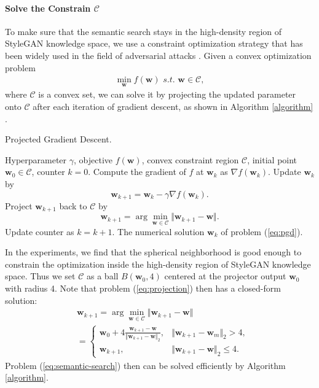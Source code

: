 \documentclass[10pt,twocolumn,letterpaper]{article}
\newcommand{\w}{\bm{w}}
\begin{document}
\paragraph{Solve the Constrain $\mathcal{C}$}To make sure that the semantic search stays in the high-density region of StyleGAN knowledge space, we use a constraint optimization strategy that has been widely used in the field of adversarial attacks \cite{guo2019simple, dong2018boosting,madry2017towards}. Given a convex optimization problem \cite{boyd2004convex}\begin{gather}\label{eq:pgd}
    \min_{\bm{w}}f(\bm{w})\,\, s.t.\,\,\bm{w}\in\mathcal{C},\end{gather}
where $\mathcal{C}$ is a convex set, we can solve it by projecting the updated parameter onto $\mathcal{C}$ after each iteration of gradient descent, as shown in Algorithm \ref{algorithm} \cite{madry2017towards}.
\begin{algorithm}[t]
	\caption{Projected Gradient Descent.}
	\label{algorithm}
	\begin{algorithmic}
		 Hyperparameter $\gamma$, objective $f(\bm{w})$, convex constraint region $\mathcal{C}$, initial point $\bm{w}_0\in\mathcal{C}$, counter $k=0$.\REPEAT
		\STATE Compute the gradient of $f$ at $\bm{w}_k$ as $\nabla f(\bm{w}_k)$.
		\STATE Update $\bm{w}_k$ by\begin{equation}
		    \bm{w}_{k+1}=\bm{w}_k-\gamma\nabla f(\bm{w}_k).\end{equation}
		\STATE Project $\bm{w}_{k+1}$ back to $\mathcal{C}$ by \begin{equation}\label{eq:projection}
		    \bm{w}_{k+1}=\arg\min_{\bm{w}\in\mathcal{C}}\Vert \bm{w}_{k+1}-\bm{w}\Vert.\end{equation}
		\STATE Update counter as $k = k+1$.
		 The numerical solution $\bm{w}_k$ of problem (\ref{eq:pgd}).
	\end{algorithmic}
\end{algorithm}


In the experiments, we find that the spherical neighborhood is good enough to constrain the optimization inside the high-density region of StyleGAN knowledge space. Thus we set $\mathcal{C}$ as a ball $B(\w_0,4)$ centered at the projector output $\w_0$ with radius 4. Note that problem (\ref{eq:projection}) then has a closed-form solution: \begin{align}
&\w_{k+1}=\arg\min_{\w\in\mathcal{C}}\Vert\w_{k+1}-\w\Vert\\
&=
\left\{\begin{array}{ll}
     \w_0+4\frac{\w_{k+1}-\w}{\Vert \w_{k+1}-\w\Vert_2},& \Vert \w_{k+1}-\w_m\Vert_2 > 4, \\
     \w_{k+1},& \Vert \w_{k+1}-\w\Vert_2\leq 4.
\end{array}\right.\end{align}
Problem (\ref{eq:semantic-search}) then can be solved efficiently by Algorithm \ref{algorithm}.
\end{document}
